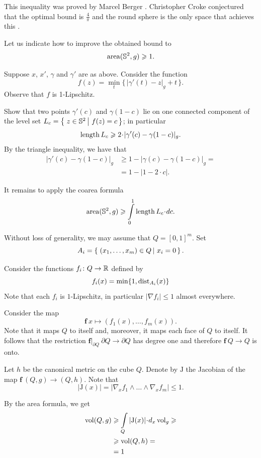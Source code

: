 This inequality was proved by Marcel Berger \cite{berger}. 
Christopher Croke conjectured that the optimal bound is $\tfrac4\pi$ and the round sphere is the only space that achieves this \cite[see Conjecture 0.3 in][]{croke}.

Let us indicate how to improve the obtained bound to
\[\operatorname{\rm area}\nolimits(\mathbb{S}^2,g)\geqslant1.\]

Suppose $x$, $x'$, $\gamma$ and $\gamma'$ are as above.
Consider the function
\[f(z)=\min_t \{\,|\gamma'(t)-z|_g+t\,\}.\]
Observe that $f$ is 1-Lipschitz.

Show that two points $\gamma'(c)$ and $\gamma(1-c)$ lie on one connected component of the level set $L_c=\set{z\in\mathbb{S}^2}{f(z)=c}$;
in particular 
\[\length L_c\ge 2\cdot|\gamma'(c)-\gamma(1-c)|_g.\]
By the triangle inequality, we have that
\begin{align*}
|\gamma'(c)-\gamma(1-c)|_g&\ge 1-|\gamma(c)-\gamma(1-c)|_g=
\\
&=1-|1-2\cdot c|.
\end{align*}

It remains to apply the coarea formula
\[\area(\mathbb{S}^2,g)\ge \int\limits_0^1\length L_c\cdot dc.\]


Without loss of generality, we may assume that $Q=[0,1]^m$.
Set 
\[A_i=\set{(x_1,\dots,x_m)\in Q}{x_i=0}.\]

Consider the functions $f_i\colon Q\to\mathbb{R}$ defined by
$$f_i(x)=\min \{1,\operatorname{\rm dist}\nolimits_{A_i}(x)\}$$
Note that each $f_i$ is $1$-Lipschitz, 
in particular $|\nabla f_i|\le 1$ almost everywhere.

Consider the map
\[\bm{f}\:x\mapsto(f_1(x),\dots,f_m(x)).\]
Note that it maps $Q$ to itself
and, moreover, it maps each face of $Q$ to itself.
It follows that the restriction $\bm{f}|_{\partial Q}\:\partial Q\to \partial Q$ has degree one and therefore 
$\bm{f}\:Q\to Q$ is onto.

Let $h$ be the canonical metric on the cube $Q$.
Denote by $\mathrm{J}$ the Jacobian of the map $\bm{f}\:(Q,g)\to (Q,h)$.
Note that 
\[|\mathrm{J}(x)|=|\nabla_x f_1\wedge\dots\wedge\nabla_xf_m|\le 1.\]

By the area formula, we get 
\begin{align*}
\vol(Q,g)
&\ge \int\limits_Q|\mathrm{J}(x)|\cdot d_x\vol_g\ge
\\
&\ge\vol(Q,h)=\\
&=1
\end{align*}

